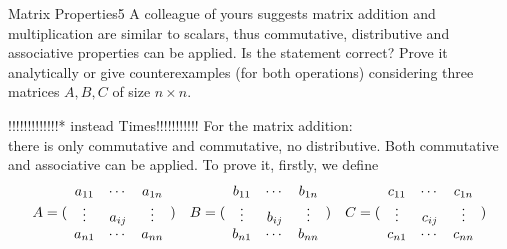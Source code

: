 \newif\ifvimbug
\vimbugfalse

\ifvimbug

\fi

 

\begin{questions}


\begin{question}{Matrix Properties}{5}
A colleague of yours suggests matrix addition and multiplication are similar to scalars, 
thus commutative, distributive and associative properties can be applied.
Is the statement correct? 
Prove it analytically or give counterexamples (for both operations) 
considering three matrices $ A, B, C$ of size $n\times n$.

\begin{answer}

    !!!!!!!!!!!!!* instead Times!!!!!!!!!!!
    For the matrix addition:\\
    there is only commutative and commutative, no distributive.
    Both commutative and associative can be applied. To prove it, firstly, we define\\
    \begin{align*}
        A = ( \begin{array}{c c c} 
            a_{11} & \cdots & a_{1n} \\
            \vdots & a_{ij} & \vdots \\ 
            a_{n1} & \cdots & a_{nn} \end{array} )  \quad
        B = ( \begin{array}{c c c} 
            b_{11} & \cdots & b_{1n} \\
            \vdots & b_{ij} & \vdots \\
            b_{n1} & \cdots & b_{nn} \end{array} )  \quad
        C = ( \begin{array}{c c c} 
            c_{11} & \cdots & c_{1n} \\
            \vdots & c_{ij} & \vdots \\
            c_{n1} & \cdots & c_{nn} \end{array} )
    \end{align*}
    

\end{answer}
\end{question}
\end{questions}
